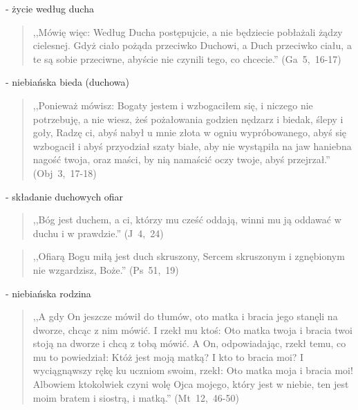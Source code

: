 \documentclass[10pt,a4paper,oneside]{article}
\begin{document}
- życie według ducha
\begin{quote}
,,Mówię więc: Według Ducha postępujcie, a nie będziecie pobłażali żądzy cielesnej. Gdyż ciało pożąda przeciwko Duchowi, a Duch przeciwko ciału, a te są sobie przeciwne, abyście nie czynili tego, co chcecie.'' (Ga~5,~16-17)
\end{quote}
- niebiańska bieda (duchowa)
\begin{quote}
,,Ponieważ mówisz: Bogaty jestem i wzbogaciłem się, i niczego nie potrzebuję, a nie wiesz, żeś pożałowania godzien nędzarz i biedak, ślepy i goły, Radzę ci, abyś nabył u mnie złota w ogniu wypróbowanego, abyś się wzbogacił i abyś przyodział szaty białe, aby nie wystąpiła na jaw haniebna nagość twoja, oraz maści, by nią namaścić oczy twoje, abyś przejrzał.'' (Obj~3,~17-18)
\end{quote}
- składanie duchowych ofiar
\begin{quote}
,,Bóg jest duchem, a ci, którzy mu cześć oddają, winni mu ją oddawać w duchu i w prawdzie.'' (J~4,~24)
\end{quote}
\begin{quote}
,,Ofiarą Bogu miłą jest duch skruszony, Sercem skruszonym i zgnębionym nie wzgardzisz, Boże.'' (Ps~51,~19)
\end{quote}
- niebiańska rodzina
\begin{quote}
,,A gdy On jeszcze mówił do tłumów, oto matka i bracia jego stanęli na dworze, chcąc z nim mówić. I rzekł mu ktoś: Oto matka twoja i bracia twoi stoją na dworze i chcą z tobą mówić. A On, odpowiadając, rzekł temu, co mu to powiedział: Któż jest moją matką? I kto to bracia moi? I wyciągnąwszy rękę ku uczniom swoim, rzekł: Oto matka moja i bracia moi! Albowiem ktokolwiek czyni wolę Ojca mojego, który jest w niebie, ten jest moim bratem i siostrą, i matką.'' (Mt~12,~46-50)
\end{quote}
\end{document}
